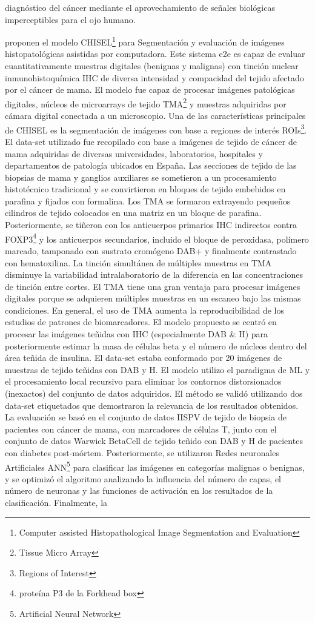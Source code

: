 diagnóstico del cáncer mediante el aprovechamiento de señales biológicas imperceptibles para el ojo humano.

\citep{Roszkowiak2021} proponen el modelo CHISEL\footnote{Computer assisted Histopathological Image Segmentation and Evaluation} para Segmentación y evaluación de imágenes histopatológicas asistidas por computadora. Este sistema e2e es capaz de evaluar cuantitativamente muestras digitales (benignas y malignas) con tinción nuclear inmunohistoquímica IHC de diversa intensidad y compacidad del tejido afectado por el cáncer de mama. El modelo fue capaz de procesar imágenes patológicas digitales, núcleos de microarrays de tejido TMA\footnote{Tissue Micro Array} y muestras adquiridas por cámara digital conectada a un microscopio. Una de las características principales de CHISEL es la segmentación de imágenes con base a regiones de interés ROIs\footnote{Regions of Interest}. El data-set utilizado fue recopilado con base a imágenes de tejido de cáncer de mama adquiridas de diversas universidades, laboratorios, hospitales y departamentos de patología ubicados en España. Las secciones de tejido de las biopsias de mama y ganglios auxiliares se sometieron a un procesamiento histotécnico tradicional y se convirtieron en bloques de tejido embebidos en parafina y fijados con formalina. Los TMA se formaron extrayendo pequeños cilindros de tejido colocados en una matriz en un bloque de parafina. Posteriormente, se tiñeron con los anticuerpos primarios IHC indirectos contra FOXP3\footnote{proteína P3 de la Forkhead box} y los anticuerpos secundarios, incluido el bloque de peroxidasa, polímero marcado, tamponado con sustrato cromógeno DAB+ y finalmente contrastado con hematoxilina. La tinción simultánea de múltiples muestras en TMA disminuye la variabilidad intralaboratorio de la diferencia en las concentraciones de tinción entre cortes. El TMA tiene una gran ventaja para procesar imágenes digitales porque se adquieren múltiples muestras en un escaneo bajo las mismas condiciones. En general, el uso de TMA aumenta la reproducibilidad de los estudios de patrones de biomarcadores. El modelo propuesto se centró en procesar las imágenes teñidas con IHC (especialmente DAB \& H) para posteriormente estimar la masa de células beta y el número de núcleos dentro del área teñida de insulina. El data-set estaba conformado por 20 imágenes de muestras de tejido teñidas con DAB y H. El modelo utilizo el paradigma de ML y el procesamiento local recursivo para eliminar los contornos distorsionados (inexactos) del conjunto de datos adquiridos. El método se validó utilizando dos data-set etiquetados que demostraron la relevancia de los resultados obtenidos. La evaluación se basó en el conjunto de datos IISPV de tejido de biopsia de pacientes con cáncer de mama, con marcadores de células T, junto con el conjunto de datos Warwick BetaCell de tejido teñido con DAB y H de pacientes con diabetes post-mórtem. Posteriormente, se utilizaron Redes neuronales Artificiales ANN\footnote{Artificial Neural Network} para clasificar las imágenes en categorías malignas o benignas, y se optimizó el algoritmo analizando la influencia del número de capas, el número de neuronas y las funciones de activación en los resultados de la clasificación. Finalmente, la 